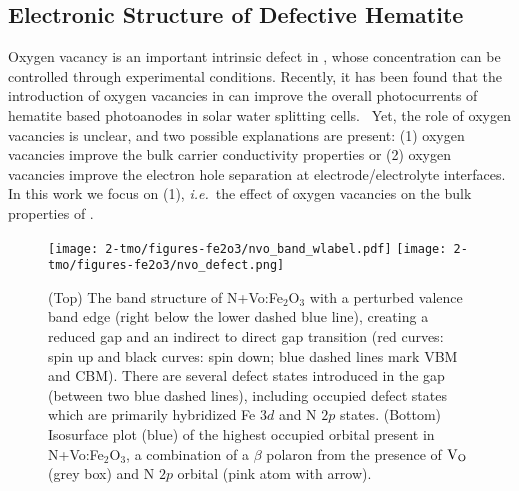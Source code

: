 \subsection{Electronic Structure of Defective Hematite}



Oxygen vacancy is an important intrinsic defect in , whose concentration can be controlled through experimental conditions. Recently, it has been found that the introduction of oxygen vacancies in  can improve the overall photocurrents of hematite based photoanodes in solar water splitting cells.~\cite{forster2015oxygen} Yet, the role of oxygen vacancies is unclear, and two possible explanations are present: (1) oxygen vacancies improve the bulk carrier conductivity properties or (2) oxygen vacancies improve the electron hole separation at electrode/electrolyte interfaces. In this work we focus on (1), \textit{i.e.}\ the effect of oxygen vacancies on the bulk properties of .



\begin{figure}
\begin{center}
\texttt{[image: 2-tmo/figures-fe2o3/nvo\_band\_wlabel.pdf]}
\texttt{[image: 2-tmo/figures-fe2o3/nvo\_defect.png]}
\caption{(Top) The band structure of N+Vo:Fe$_2$O$_3$ with a perturbed valence band edge (right below the lower dashed blue line), creating a reduced gap and an indirect to direct gap transition (red curves: spin up and black curves: spin down; blue dashed lines mark VBM and CBM). There are several defect states introduced in the gap (between two blue dashed lines), including occupied defect states which are primarily hybridized Fe $3d$ and N $2p$ states. (Bottom) Isosurface plot (blue) of the highest occupied orbital present in N+Vo:Fe$_2$O$_3$, a combination of a $\beta$ polaron from the presence of $\text{V}_\text{O}$ (grey box) and N $2p$ orbital (pink atom with arrow).} \label{fe2o3:fig:nvo}
\end{center}
\end{figure}


